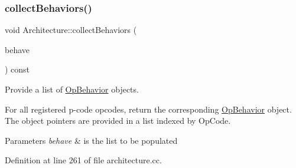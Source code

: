 \mbox{\label{class_architecture_a5499f02b08260cd95354143546fd374b}} 
\subsubsection{\texorpdfstring{collectBehaviors()}{collectBehaviors()}}
{\footnotesize\ttfamily void Architecture\+::collect\+Behaviors (\begin{DoxyParamCaption}\item[{vector$<$ \mbox{\hyperlink{class_op_behavior}{Op\+Behavior}} $\ast$ $>$ \&}]{behave }\end{DoxyParamCaption}) const}



Provide a list of \mbox{\hyperlink{class_op_behavior}{Op\+Behavior}} objects. 

For all registered p-\/code opcodes, return the corresponding \mbox{\hyperlink{class_op_behavior}{Op\+Behavior}} object. The object pointers are provided in a list indexed by Op\+Code. 
\begin{DoxyParams}{Parameters}
{\em behave} & is the list to be populated \\
\hline
\end{DoxyParams}


Definition at line 261 of file architecture.\+cc.

